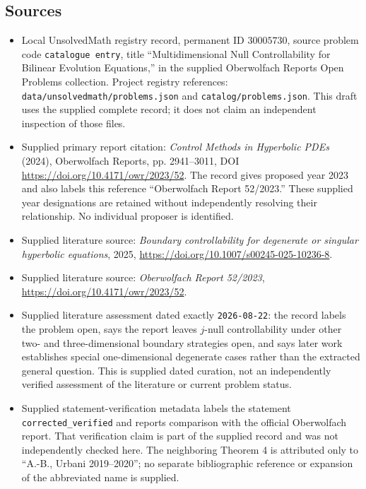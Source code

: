 \documentclass[11pt]{article}
\begin{document}
\subsection{Sources}
\begin{itemize}
\item Local UnsolvedMath registry record, permanent ID \(30005730\), source problem code \texttt{catalogue entry}, title ``Multidimensional Null Controllability for Bilinear Evolution Equations,'' in the supplied Oberwolfach Reports Open Problems collection. Project registry references: \texttt{data/unsolvedmath/problems.json} and \texttt{catalog/problems.json}. This draft uses the supplied complete record; it does not claim an independent inspection of those files.
\item Supplied primary report citation: \emph{Control Methods in Hyperbolic PDEs} (2024), Oberwolfach Reports, pp. 2941--3011, DOI \url{https://doi.org/10.4171/owr/2023/52}. The record gives proposed year 2023 and also labels this reference ``Oberwolfach Report 52/2023.'' These supplied year designations are retained without independently resolving their relationship. No individual proposer is identified.
\item Supplied literature source: \emph{Boundary controllability for degenerate or singular hyperbolic equations}, 2025, \url{https://doi.org/10.1007/s00245-025-10236-8}.
\item Supplied literature source: \emph{Oberwolfach Report 52/2023}, \url{https://doi.org/10.4171/owr/2023/52}.
\item Supplied literature assessment dated exactly \texttt{2026-08-22}: the record labels the problem open, says the report leaves \(j\)-null controllability under other two- and three-dimensional boundary strategies open, and says later work establishes special one-dimensional degenerate cases rather than the extracted general question. This is supplied dated curation, not an independently verified assessment of the literature or current problem status.
\item Supplied statement-verification metadata labels the statement \texttt{corrected\_verified} and reports comparison with the official Oberwolfach report. That verification claim is part of the supplied record and was not independently checked here. The neighboring Theorem 4 is attributed only to ``A.-B., Urbani 2019--2020''; no separate bibliographic reference or expansion of the abbreviated name is supplied.
\end{itemize}
\end{document}
